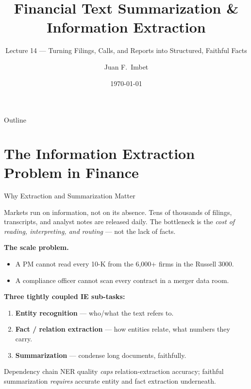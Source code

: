 \documentclass[9pt,t]{beamer}
\title{Financial Text Summarization \& Information Extraction}
\subtitle{Lecture 14 --- Turning Filings, Calls, and Reports into Structured, Faithful Facts}
\author{Juan F.\ Imbet}
\institute{Paris Dauphine -- PSL University}
\date{\today}
\begin{document}
\begin{frame}\titlepage\end{frame}

\begin{frame}{Outline}\tableofcontents\end{frame}

\section{The Information Extraction Problem in Finance}

\begin{frame}{Why Extraction and Summarization Matter}
\begin{bigpicture}
Markets run on information, not on its absence. Tens of thousands of filings,
transcripts, and analyst notes are released daily. The bottleneck is the
\emph{cost of reading, interpreting, and routing} --- not the lack of facts.
\end{bigpicture}

\medskip
\textbf{The scale problem.}
\begin{itemize}
  \item A PM cannot read every 10-K from the 6{,}000+ firms in the Russell 3000.
  \item A compliance officer cannot scan every contract in a merger data room.
\end{itemize}

\medskip
\textbf{Three tightly coupled IE sub-tasks:}
\begin{enumerate}
  \item \textbf{Entity recognition} --- who/what the text refers to.
  \item \textbf{Fact / relation extraction} --- how entities relate, what numbers they carry.
  \item \textbf{Summarization} --- condense long documents, faithfully.
\end{enumerate}
\begin{block}{Dependency chain}
NER quality \emph{caps} relation-extraction accuracy; faithful summarization
\emph{requires} accurate entity and fact extraction underneath.
\end{block}
\end{frame}
\end{document}
